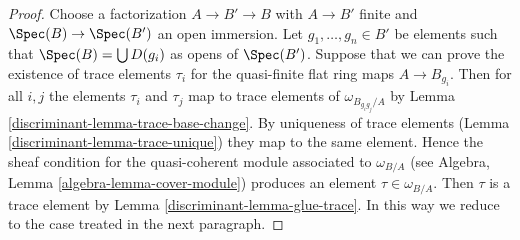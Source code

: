 \begin{proof}

Choose a factorization $A \to B' \to B$ with $A \to B'$ finite and
$\Spec(B) \to \Spec(B')$ an open immersion. Let $g_1, \ldots, g_n \in B'$
be elements such that $\Spec(B) = \bigcup D(g_i)$ as opens of $\Spec(B')$.
Suppose that we can prove the existence of trace elements $\tau_i$ for the
quasi-finite flat ring maps $A \to B_{g_i}$. Then for all $i, j$ the elements
$\tau_i$ and $\tau_j$ map to trace elements of $\omega_{B_{g_ig_j}/A}$
by Lemma \ref{discriminant-lemma-trace-base-change}. By uniqueness of
trace elements (Lemma \ref{discriminant-lemma-trace-unique}) they map to the same element.
Hence the sheaf condition for the quasi-coherent module associated to
$\omega_{B/A}$ (see Algebra, Lemma \ref{algebra-lemma-cover-module})
produces an element $\tau \in \omega_{B/A}$.
Then $\tau$ is a trace element by
Lemma \ref{discriminant-lemma-glue-trace}.
In this way we reduce to the case treated in the next paragraph.


\end{proof}
